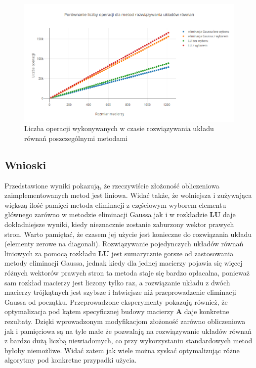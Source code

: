 \documentclass{mk-polish-lab-report}
\newcommand{\mA}{\bm{A}}
\newcommand{\mL}{\bm{L}}
\newcommand{\mU}{\bm{U}}
\begin{document}
\begin{figure}[h]
\includegraphics[width=\textwidth]{wykres.png}
\caption{Liczba operacji wykonywanych w czasie rozwiązywania układu równań poszczególnymi metodami}
\label{fig:wykres}
\end{figure} 	

\subsection{Wnioski}

Przedstawione wyniki pokazują, że rzeczywiście złożoność obliczeniowa zaimplementowanych metod jest liniowa. Widać także, że wolniejsza i zużywająca większą ilość pamięci metoda eliminacji z częściowym wyborem elementu głównego zarówno w metodzie eliminacji Gaussa jak i w rozkładzie $\mL\mU$ daje dokładniejsze wyniki, kiedy nieznacznie zostanie zaburzony wektor prawych stron. Warto pamiętać, że czasem jej użycie jest konieczne do rozwiązania układu (elementy zerowe na diagonali). Rozwiązywanie pojedynczych układów równań liniowych za pomocą rozkładu $\mL\mU$ jest sumarycznie gorsze od zastosowania metody eliminacji Gaussa, jednak kiedy dla jednej macierzy pojawia się więcej różnych wektorów prawych stron ta metoda staje się bardzo opłacalna, ponieważ sam rozkład macierzy jest liczony tylko raz, a rozwiązanie układu z dwóch macierzy trójkątnych jest szybsze i łatwiejsze niż przeprowadzenie eliminacji Gaussa od początku. Przeprowadzone eksperymenty pokazują również, że optymalizacja pod kątem specyficznej budowy macierzy $\mA$ daje konkretne rezultaty. Dzięki wprowadzonym modyfikacjom złożoność zarówno obliczeniowa jak i pamięciowa są na tyle małe że pozwalają na rozwiązywanie układów równań z bardzo dużą liczbą niewiadomych, co przy wykorzystaniu standardowych metod byłoby niemożliwe. Widać zatem jak wiele można zyskać optymalizując różne algorytmy pod konkretne przypadki użycia.
\end{document}
